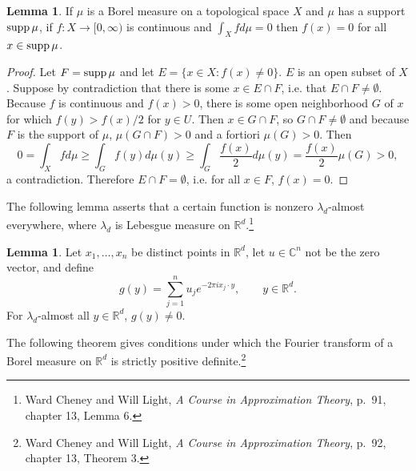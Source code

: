 \documentclass{article}
\newcommand{\supp}{\ensuremath\mathrm{supp}\,}
\theoremstyle{definition}
\newtheorem{lemma}[theorem]{Lemma}
\theoremstyle{definition}
\begin{document}
\begin{lemma}
 If $\mu$ is a Borel measure on a topological space $X$ and $\mu$ has a support
 $\supp \mu$, if $f:X \to [0,\infty)$ is continuous and $\int_X f d\mu=0$ then $f(x)=0$ for all
 $x \in \supp \mu$. 
 \label{supplemma}
 \end{lemma}
 \begin{proof}
 Let $F = \supp \mu$ and let $E=\{x \in X: f(x) \neq 0\}$. $E$ is an open subset of $X$. Suppose by contradiction
 that there is some $x \in E \cap F$, i.e. that $E \cap F \neq  \emptyset$. Because $f$ is continuous and $f(x)>0$,
 there is some open neighborhood $G$ of $x$ for which $f(y) > f(x)/2$ for $y \in U$. 
Then $x \in G \cap F$, so $G \cap F \neq \emptyset$ and because $F$ is the support of $\mu$,
$\mu(G \cap F)>0$ and a fortiori $\mu(G)>0$. Then
\[
0=\int_X f d\mu \geq \int_G f(y) d\mu(y) \geq \int_G \frac{f(x)}{2} d\mu(y)
=\frac{f(x)}{2} \mu(G)>0, 
\]
 a contradiction. Therefore $E \cap F = \emptyset$, i.e. for all $x \in F$, $f(x)=0$. 
 \end{proof}
 
 
The following lemma asserts that a certain function is nonzero $\lambda_d$-almost everywhere, where $\lambda_d$ is Lebesgue
measure on $\mathbb{R}^d$.\footnote{Ward Cheney and Will Light, {\em A Course
in Approximation Theory}, p.~91, chapter 13, Lemma 6.}
 
\begin{lemma}
Let $x_1,\ldots,x_n$ be distinct points in $\mathbb{R}^d$, let $u \in \mathbb{C}^n$ not be the zero vector, and define
\[
g(y) = \sum_{j=1}^n u_j e^{-2\pi ix_j \cdot y}, \qquad y \in \mathbb{R}^d.
\]
For $\lambda_d$-almost all $y \in \mathbb{R}^d$, $g(y) \neq 0$.
 \label{lebesguelemma}
\end{lemma}


 
The following theorem gives conditions under which the Fourier transform of a Borel measure on $\mathbb{R}^d$ is strictly
positive definite.\footnote{Ward Cheney and Will Light, {\em A Course
in Approximation Theory}, p.~92, chapter 13, Theorem 3.}
\end{document}
